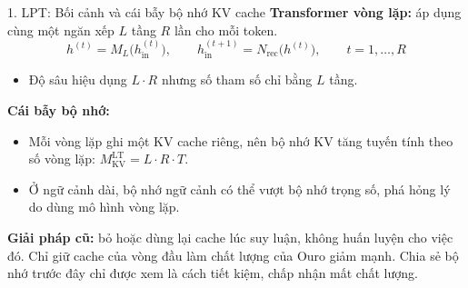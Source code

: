 \begin{frame}{1. LPT: Bối cảnh và cái bẫy bộ nhớ KV cache}
    \textbf{Transformer vòng lặp:} áp dụng cùng một ngăn xếp $L$ tầng $R$ lần cho mỗi token.
    $$h^{(t)} = M_L\big(h_{\text{in}}^{(t)}\big), \qquad h_{\text{in}}^{(t+1)} = N_{\text{rec}}\big(h^{(t)}\big), \qquad t = 1, \dots, R$$
    \begin{itemize}
        \item Độ sâu hiệu dụng $L \cdot R$ nhưng số tham số chỉ bằng $L$ tầng.
    \end{itemize}
    \vspace{0.15cm}
    \textbf{Cái bẫy bộ nhớ:}
    \begin{itemize}
        \item Mỗi vòng lặp ghi một KV cache riêng, nên bộ nhớ KV tăng tuyến tính theo số vòng lặp: $M_{\text{KV}}^{\text{LT}} = L \cdot R \cdot T$.
        \item Ở ngữ cảnh dài, bộ nhớ ngữ cảnh có thể vượt bộ nhớ trọng số, phá hỏng lý do dùng mô hình vòng lặp.
    \end{itemize}
    \vspace{0.15cm}
    \textbf{Giải pháp cũ:} bỏ hoặc dùng lại cache lúc suy luận, không huấn luyện cho việc đó. Chỉ giữ cache của vòng đầu làm chất lượng của Ouro giảm mạnh. Chia sẻ bộ nhớ trước đây chỉ được xem là cách tiết kiệm, chấp nhận mất chất lượng.
\end{frame}

